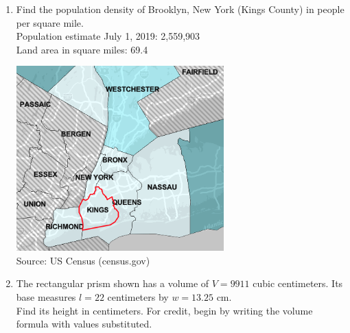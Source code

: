 \documentclass[12pt, twoside]{article}
\begin{document}
\begin{enumerate}
\newpage
\item Find the population density of Brooklyn, New York (Kings County) in people per square mile.\\[0.5cm]
Population estimate July 1, 2019: 2,559,903\\[0.25cm]
Land area in square miles: 69.4
\begin{flushright}
  \includegraphics[width=8cm]{6-15-7-Brooklyn.png}\\
  Source: US Census (census.gov)
\end{flushright}

\newpage
\item The rectangular prism shown has a volume of $V=9911$ cubic centimeters. Its base measures $l=22$ centimeters by $w=13.25$ cm. \\[0.5cm]
Find its height in centimeters. For credit, begin by writing the volume formula with values substituted.
\begin{flushright}
\end{flushright}


\end{enumerate}
\end{document}
